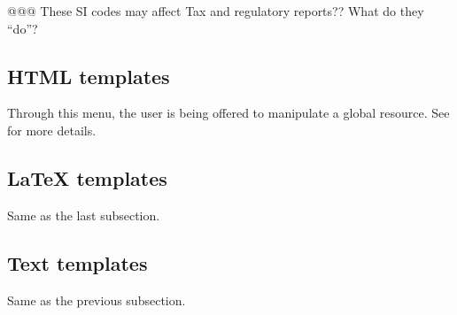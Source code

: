 @@@ These SI codes may affect Tax and regulatory reports?? What do they ``do''?

\subsection{HTML templates}

Through this menu, the user is being offered to manipulate a global resource. See
 for more details.

\subsection{LaTeX templates}

Same as the last subsection.

\subsection{Text templates}

Same as the previous subsection.


